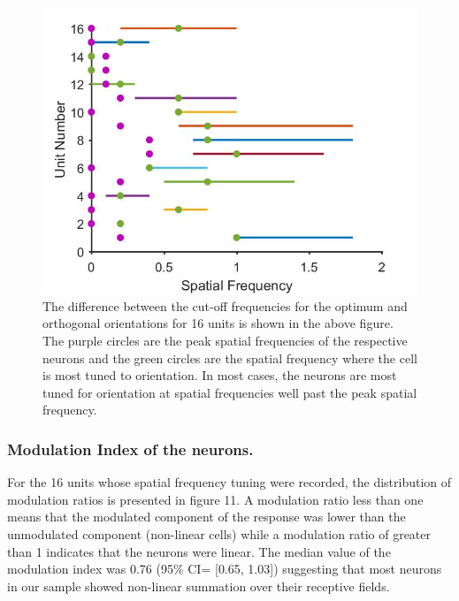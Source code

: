 		\begin{figure}[H]
		\includegraphics[width=\linewidth]{superiorcolliculus/sf_bandwidth.jpg}
		\caption{The difference between the cut-off frequencies
			for the optimum and orthogonal orientations for 16 units is shown in the
			above figure. The purple circles are the peak spatial frequencies of the
			respective neurons and the green circles are the spatial frequency where
			the cell is most tuned to orientation. In most cases, the neurons are
			most tuned for orientation at spatial frequencies well past the peak
			spatial frequency.}
		\label{fig:sf_bw}			
		\end{figure}
	
	\subsubsection{Modulation Index of the neurons.}
	
For the 16 units whose spatial frequency tuning were recorded, the
distribution of modulation ratios is presented in figure 11. A
modulation ratio less than one means that the modulated component of the
response was lower than the unmodulated component (non-linear cells)
while a modulation ratio of greater than 1 indicates that the neurons
were linear. The median value of the modulation index was 0.76 (95\% CI=
{[}0.65, 1.03{]}) suggesting that most neurons in our sample showed
non-linear summation over their receptive fields.
	
